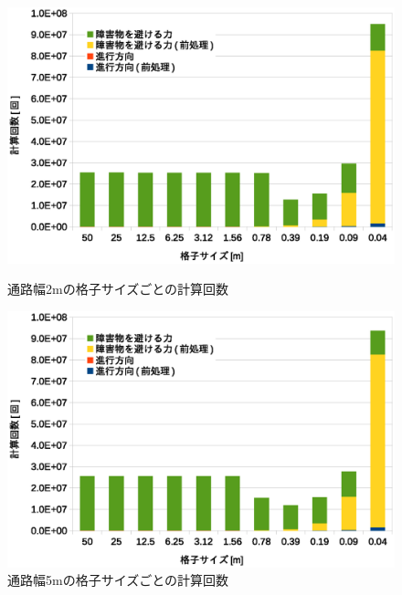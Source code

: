 

\clearpage


\begin{figure}[tb]
	\begin{minipage}[b]{0.48\columnwidth}
		\begin{center}
		\includegraphics[width=\columnwidth]{figure/5_result_2m_times.eps}
		\caption{通路幅2mの格子サイズごとの計算回数}
		\label{fig:result_2m_times}
		\end{center}
	\end{minipage}
	\hspace{0.04\columnwidth}
	\begin{minipage}[b]{0.48\columnwidth}
		\begin{center}
		\includegraphics[width=\columnwidth]{figure/5_result_5m_times.eps}
		\caption{通路幅5mの格子サイズごとの計算回数}
		\label{fig:result_5m_times}
		\end{center}
	\end{minipage}
\end{figure}
